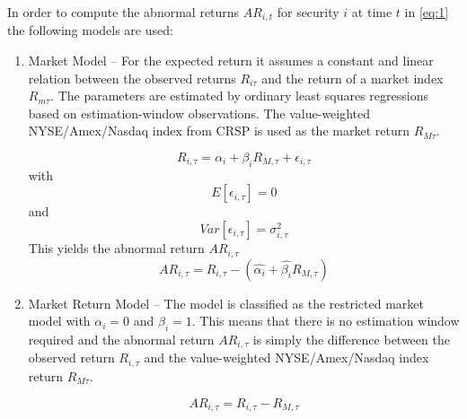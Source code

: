 \documentclass[12pt]{article}
\begin{document}
In order to compute the abnormal returns $AR_{i,t}$ for security $i$ at time $t$ in \eqref{eq:1} the following models are used: 
	\begin{enumerate}
		\item Market Model -- For the expected return it assumes a constant and linear relation between the observed returns $R_{i\tau}$ and the return of a market index $R_{m\tau}$. The parameters are estimated by ordinary least squares regressions based on estimation-window observations. The value-weighted NYSE/Amex/Nasdaq index from CRSP is used as the market return $R_{M\tau}$.

			\begin{equation}
				R_{i,\tau}=\alpha_{i}+\beta_{i}R_{M,\tau}+\epsilon_{i,\tau}
			\end{equation}
			with 
			\begin{equation}
				E[\epsilon_{i,\tau}]=0
			\end{equation}
			and 
			\begin{equation}
				Var[\epsilon_{i,\tau}]=\sigma^2_{i,\tau}
			\end{equation}
			This yields the abnormal return $AR_{i,\tau}$
			\begin{equation}
				AR_{i,\tau}=R_{i,\tau}-(\hat{\alpha_{i}}+\hat{\beta_{i}}R_{M,\tau})
			\end{equation}
			
		\item Market Return Model -- The model is classified as the restricted market model with $\alpha_{i}=0$ and $\beta_{i}=1$. This means that there is no estimation window required and the abnormal return $AR_{i,\tau}$ is  simply the difference between the observed return $R_{i,\tau}$ and the value-weighted NYSE/Amex/Nasdaq index return $R_{M\tau}$.

			\begin{equation}\label{eq:6}
				AR_{i,\tau}=R_{i,\tau}-R_{M,\tau}
			\end{equation}	
	\end{enumerate}
	
\end{document}
